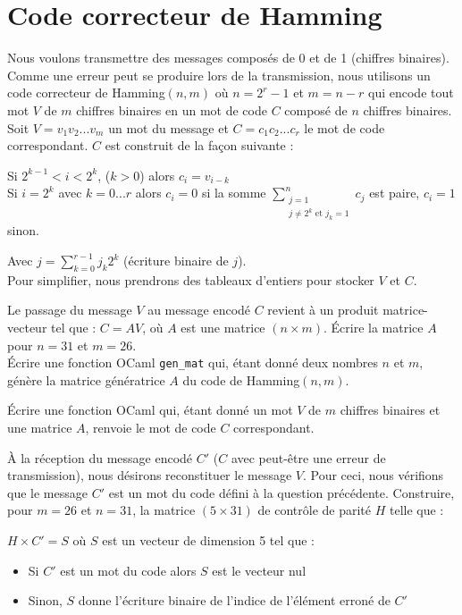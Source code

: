 \renewcommand{\SourceFile}{2-jouer-avec-les-mots/src/2-7.ml}

\section{Code correcteur de Hamming}

Nous voulons transmettre des messages composés de 0 et de 1 (chiffres binaires). Comme une erreur peut se produire lors de la transmission, nous utilisons un code correcteur de Hamming$(n,m)$ où $n=2^r-1$ et $m=n-r$ qui encode tout mot $V$ de $m$ chiffres binaires en un mot de code $C$ composé de $n$ chiffres binaires. Soit $V=v_1v_2...v_m$ un mot du message et $C=c_1c_2...c_r$ le mot de code correspondant. $C$ est construit de la façon suivante :
\medskip

Si $2^{k-1} < i < 2^{k}$, ($k > 0$) alors $c_i=v_{i-k}$\\
Si $i=2^k$ avec $k=0...r$ alors $c_i=0$ si la somme $\displaystyle\sum_{\substack{j=1\\ j \neq 2^k \textrm{ et } j_k=1}}^{n}c_j$ est paire, $c_i=1$ sinon.

Avec $\displaystyle j=\sum_{k=0}^{r-1}j_k2^k$ (écriture binaire de $j$).\\
Pour simplifier, nous prendrons des tableaux d'entiers pour stocker $V$ et $C$.

\Q
Le passage du message $V$ au message encodé $C$ revient à un produit matrice-vecteur tel que : $C=AV$, où $A$ est une matrice $(n \times m)$. Écrire la matrice $A$ pour $n=31$ et $m=26$.\\
Écrire une fonction OCaml \texttt{gen\_mat} qui, étant donné deux nombres $n$ et $m$, génère la matrice génératrice $A$ du code de Hamming$(n,m)$.

\Q
Écrire une fonction OCaml qui, étant donné un mot $V$ de $m$ chiffres binaires et une matrice $A$, renvoie le mot de code $C$ correspondant.

\Q
À la réception du message encodé $C'$ ($C$ avec peut-être une erreur de transmission), nous désirons reconstituer le message $V$. Pour ceci, nous vérifions que le message $C'$ est un mot du code défini à la question précédente. Construire, pour $m=26$ et $n=31$, la matrice $(5 \times 31)$ de contrôle de parité $H$ telle que :
\medskip

$H \times C' = S$ où $S$ est un vecteur de dimension 5 tel que :
\begin{itemize}
    \item Si $C'$ est un mot du code alors $S$ est le vecteur nul
    \item Sinon, $S$ donne l'écriture binaire de l'indice de l'élément erroné de $C'$
\end{itemize}
\medskip

